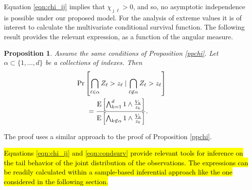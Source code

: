 \documentclass[iicol,sn-basic]{sn-jnl}
\newtheorem{prop}{Proposition}
\newcommand{\expect}[1]{\text{E}\left[#1\right]}
\theoremstyle{thmstyleone}
\begin{document}
Equation \ref{eqn:chi_ij} implies that $\chi_{\jmath\ell}>0$, and so, no asymptotic independence is possible under our proposed model. For the analysis of extreme values it is of interest to calculate the multivariate conditional survival function. The following result provides the relevant expression, as a function of the angular measure.
\begin{prop}
Assume the same conditions of Proposition \ref{ppchi}. Let $\alpha \subset \{1, \ldots ,d\}$ be a collections of indexes. Then
\begin{equation} \label{eqn:condsurv}
\begin{aligned}
&\hspace{-0.5cm}\mathrm{Pr}\left[\bigcap_{\ell \in \alpha} Z_\ell > z_\ell \mid \bigcap_{\ell\not\in\alpha} Z_\ell > z_\ell\right] \\
&= \frac{\expect{\bigwedge_{k = 1}^d 1\wedge \frac{V_k}{z_k}}}{\expect{\bigwedge_{k \not\in\alpha}1\wedge\frac{V_k}{z_k}}}.
\end{aligned}
\end{equation}
\end{prop}
The proof uses a similar approach to the proof of Proposition \ref{ppchi}.

\hl{Equations \mbox{\ref{eqn:chi_ij}} and \mbox{\ref{eqn:condsurv}} provide relevant tools for inference on the tail behavior of the joint distribution of the observations. The expressions can be readily calculated within a sample-based inferential approach like the one considered in the following section.}
\end{document}
